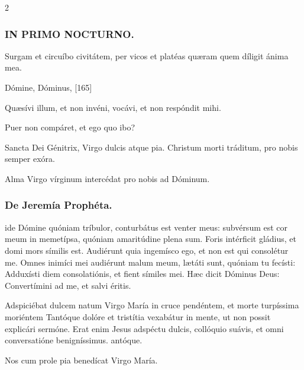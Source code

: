 \documentclass[9pt,twoside]{extarticle}
\begin{document}
\begin{multicols}{2}
\subsubsection*{\center \textsc{IN PRIMO NOCTURNO.}}
\begin{tightlist}{}
\item {} Surgam et circuíbo civitátem, per vicos et platéas quæram quem díligit ánima mea.
\item {} Dómine, Dóminus,  [165]
\item {} Quæsívi illum, et non invéni, vocávi, et non respóndit mihi.
\item {} Puer non compáret, et ego quo ibo?
\item {} Sancta Dei Génitrix, Virgo dulcis atque pia.  Christum morti tráditum, pro nobis semper exóra.
\item {}
\item {\small {} Alma Virgo vírginum intercédat pro nobis ad Dóminum.}
\end{tightlist}

\subsubsection*{\center De Jeremía Prophéta.}
\begin{center}\end{center}
ide Dómine quóniam tríbulor, conturbátus est venter meus: subvérsum est cor meum in memetípsa, quóniam amaritúdine plena sum. Foris intérficit gládius, et domi mors símilis est.
Audiérunt quia ingemísco ego, et non est qui consolétur me. Omnes inimíci mei audiérunt malum meum, lætáti sunt, quóniam tu fecísti: Adduxísti diem consolatiónis, et fient símiles mei. Hæc dicit Dóminus Deus: Convertímini ad me, et salvi éritis.

\begin{tightlist}{}
\item {} Adspiciébat dulcem natum Virgo María in cruce pendéntem, et morte turpíssima moriéntem \textred{*} Tantóque dolóre et tristítia vexabátur in mente, ut non possit explicári sermóne.  Erat enim Jesus adspéctu dulcis, collóquio suávis, et omni conversatióne benigníssimus. antóque.
\item {\small {} Nos cum prole pia benedícat Virgo María.}
\end{tightlist}


\end{multicols}
\end{document}
